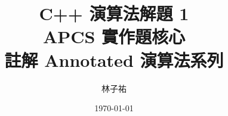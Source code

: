 \documentclass[12pt]{report}
\title{C++ 演算法解題 1\\[0.3em]{\LARGE APCS 實作題核心}\\[1.2em]{\large 註解 Annotated 演算法系列}}
\author{林子祐}
\date{\today}
\begin{document}
\maketitle
\romantableofcontents



















\end{document}

